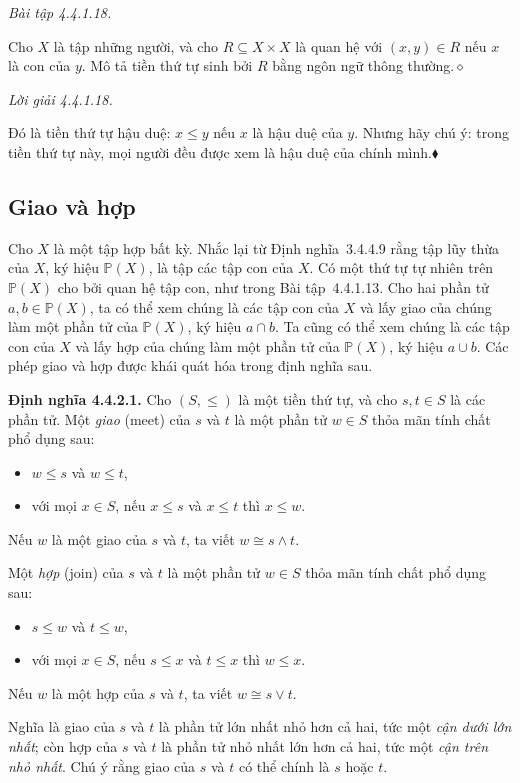 \noindent\textit{Bài tập 4.4.1.18.}\keepwithnext

Cho $X$ là tập những người, và cho $R\subseteq X\times X$ là quan hệ với $(x,y)\in R$ nếu $x$ là con của $y$. Mô tả tiền thứ tự sinh bởi $R$ bằng ngôn ngữ thông thường.\hfill$\diamond$

\noindent\textit{Lời giải 4.4.1.18.}\keepwithnext

Đó là tiền thứ tự hậu duệ: $x\le y$ nếu $x$ là hậu duệ của $y$. Nhưng hãy chú ý: trong tiền thứ tự này, mọi người đều được xem là hậu duệ của chính mình.\hfill$\blacklozenge$

\subsection{Giao và hợp}

Cho $X$ là một tập hợp bất kỳ. Nhắc lại từ Định nghĩa~3.4.4.9 rằng tập lũy thừa của $X$, ký hiệu $\mathbb{P}(X)$, là tập các tập con của $X$. Có một thứ tự tự nhiên trên $\mathbb{P}(X)$ cho bởi quan hệ tập con,
như trong Bài tập~4.4.1.13. Cho hai phần tử $a,b\in\mathbb{P}(X)$, ta có thể xem chúng là các tập con của $X$ và lấy giao của chúng làm một phần tử của $\mathbb{P}(X)$, ký hiệu $a\cap b$. Ta cũng có thể xem chúng là các tập con của $X$ và lấy hợp của chúng làm một phần tử của $\mathbb{P}(X)$, ký hiệu $a\cup b$. Các phép giao và hợp được khái quát hóa trong định nghĩa sau.

\noindent\textbf{Định nghĩa 4.4.2.1.} Cho $(S,\le)$ là một tiền thứ tự, và cho $s,t\in S$ là các phần tử. Một \emph{giao} (meet) của $s$ và $t$ là một phần tử $w\in S$ thỏa mãn tính chất phổ dụng sau:
\begin{itemize}
\item $w\le s$ và $w\le t$,
\item với mọi $x\in S$, nếu $x\le s$ và $x\le t$ thì $x\le w$.
\end{itemize}
Nếu $w$ là một giao của $s$ và $t$, ta viết $w\cong s\wedge t$.

Một \emph{hợp} (join) của $s$ và $t$ là một phần tử $w\in S$ thỏa mãn tính chất phổ dụng sau:
\begin{itemize}
\item $s\le w$ và $t\le w$,
\item với mọi $x\in S$, nếu $s\le x$ và $t\le x$ thì $w\le x$.
\end{itemize}
Nếu $w$ là một hợp của $s$ và $t$, ta viết $w\cong s\vee t$.

Nghĩa là giao của $s$ và $t$ là phần tử lớn nhất nhỏ hơn cả hai, tức một \emph{cận dưới lớn nhất}; còn hợp của $s$ và $t$ là phần tử nhỏ nhất lớn hơn cả hai, tức một \emph{cận trên nhỏ nhất}. Chú ý rằng giao của $s$ và $t$ có thể chính là $s$ hoặc $t$.

